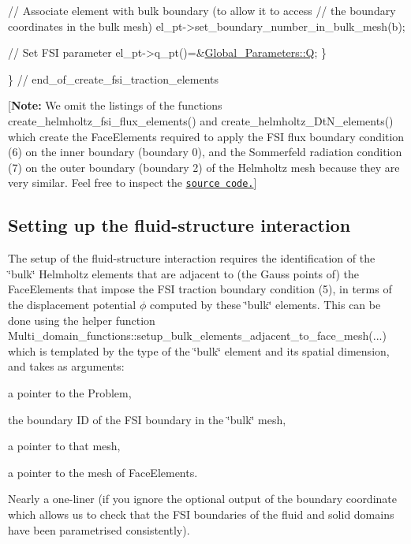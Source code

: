 \begin{DoxyCodeInclude}
   
   \textcolor{comment}{// Associate element with bulk boundary (to allow it to access}
   \textcolor{comment}{// the boundary coordinates in the bulk mesh)}
   el\_pt->set\_boundary\_number\_in\_bulk\_mesh(b); 
   
   \textcolor{comment}{// Set FSI parameter}
   el\_pt->q\_pt()=&\hyperlink{namespaceGlobal__Parameters_a7814fddf663e56168174a42d2cd6b4c1}{Global\_Parameters::Q};
  \}
 
\} \textcolor{comment}{// end\_of\_create\_fsi\_traction\_elements}

\end{DoxyCodeInclude}


\mbox{[}{\bfseries Note\+:} We omit the listings of the functions {\ttfamily create\+\_\+helmholtz\+\_\+fsi\+\_\+flux\+\_\+elements()} and {\ttfamily create\+\_\+helmholtz\+\_\+\+Dt\+N\+\_\+elements()} which create the {\ttfamily Face\+Elements} required to apply the F\+SI flux boundary condition (6) on the inner boundary (boundary 0), and the Sommerfeld radiation condition (7) on the outer boundary (boundary 2) of the Helmholtz mesh because they are very similar. Feel free to inspect the \href{../../../../demo_drivers/interaction/fourier_decomposed_acoustic_fsi/fourier_decomposed_acoustic_fsi.cc}{\tt source code.}\mbox{]}



 

\hypertarget{index_fsi}{}\subsection{Setting up the fluid-\/structure interaction}\label{index_fsi}
The setup of the fluid-\/structure interaction requires the identification of the \char`\"{}bulk\char`\"{} Helmholtz elements that are adjacent to (the Gauss points of) the {\ttfamily Face\+Elements} that impose the F\+SI traction boundary condition (5), in terms of the displacement potential $ \phi $ computed by these \char`\"{}bulk\char`\"{} elements. This can be done using the helper function {\ttfamily Multi\+\_\+domain\+\_\+functions\+::setup\+\_\+bulk\+\_\+elements\+\_\+adjacent\+\_\+to\+\_\+face\+\_\+mesh}(...) which is templated by the type of the \char`\"{}bulk\char`\"{} element and its spatial dimension, and takes as arguments\+:
\begin{DoxyItemize}
\item a pointer to the {\ttfamily Problem},
\item the boundary ID of the F\+SI boundary in the \char`\"{}bulk\char`\"{} mesh,
\item a pointer to that mesh,
\item a pointer to the mesh of {\ttfamily Face\+Elements}.
\end{DoxyItemize}Nearly a one-\/liner (if you ignore the optional output of the boundary coordinate which allows us to check that the F\+SI boundaries of the fluid and solid domains have been parametrised consistently).

